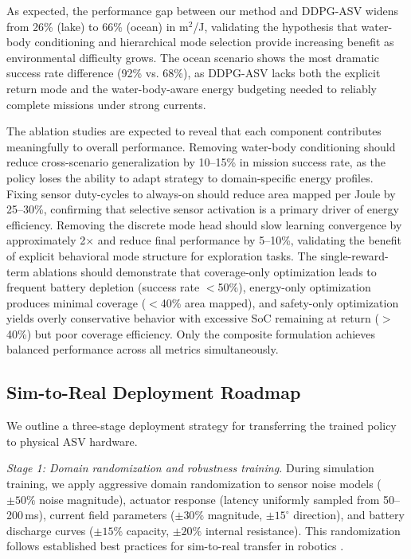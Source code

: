 \documentclass[conference]{IEEEtran}
\begin{document}
As expected, the performance gap between our method and DDPG-ASV widens from 26\% (lake) to 66\% (ocean) in m$^2$/J, validating the hypothesis that water-body conditioning and hierarchical mode selection provide increasing benefit as environmental difficulty grows. The ocean scenario shows the most dramatic success rate difference (92\% vs. 68\%), as DDPG-ASV lacks both the explicit return mode and the water-body-aware energy budgeting needed to reliably complete missions under strong currents.

The ablation studies are expected to reveal that each component contributes meaningfully to overall performance. Removing water-body conditioning should reduce cross-scenario generalization by 10--15\% in mission success rate, as the policy loses the ability to adapt strategy to domain-specific energy profiles. Fixing sensor duty-cycles to always-on should reduce area mapped per Joule by 25--30\%, confirming that selective sensor activation is a primary driver of energy efficiency. Removing the discrete mode head should slow learning convergence by approximately 2$\times$ and reduce final performance by 5--10\%, validating the benefit of explicit behavioral mode structure for exploration tasks. The single-reward-term ablations should demonstrate that coverage-only optimization leads to frequent battery depletion (success rate $<$50\%), energy-only optimization produces minimal coverage ($<$40\% area mapped), and safety-only optimization yields overly conservative behavior with excessive SoC remaining at return ($>$40\%) but poor coverage efficiency. Only the composite formulation achieves balanced performance across all metrics simultaneously.


\subsection{Sim-to-Real Deployment Roadmap}

We outline a three-stage deployment strategy for transferring the trained policy to physical ASV hardware.

\textit{Stage 1: Domain randomization and robustness training.} During simulation training, we apply aggressive domain randomization to sensor noise models ($\pm 50\%$ noise magnitude), actuator response (latency uniformly sampled from 50--200\,ms), current field parameters ($\pm 30\%$ magnitude, $\pm 15^\circ$ direction), and battery discharge curves ($\pm 15\%$ capacity, $\pm 20\%$ internal resistance). This randomization follows established best practices for sim-to-real transfer in robotics \cite{Tobin2017DomainRandomization, Peng2018SimToReal}.
\end{document}
